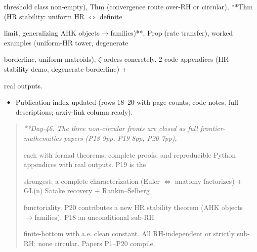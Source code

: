\documentclass[10pt]{article}
\begin{document}
  threshold class non-empty), Thm (convergence route over-RH or circular), **Thm (HR stability: uniform HR \ensuremath{\iff} definite\par
  limit, generalizing AHK objects\ensuremath{\to}families)**, Prop (rate transfer), worked examples (uniform-HR tower, degenerate\par
  borderline, uniform matroids), \ensuremath{\zeta}-orders concretely. 2 code appendices (HR stability demo, degenerate borderline) +\par
  real outputs.\par
\begin{itemize}
\item Publication index updated (rows 18--20 with page counts, code notes, full descriptions; arxiv-link column ready).
\end{itemize}

\begin{quote}\itshape
**Day-46. The three non-circular fronts are closed as full frontier-mathematics papers (P18 9pp, P19 8pp, P20 7pp),\par
each with formal theorems, complete proofs, and reproducible Python appendices with real outputs. P19 is the\par
strongest: a complete characterization (Euler \ensuremath{\iff} anatomy factorizes) + GL(n) Satake recovery + Rankin--Selberg\par
functoriality. P20 contributes a new HR stability theorem (AHK objects\ensuremath{\to}families). P18 an unconditional sub-RH\par
finite-bottom with a.e. clean constant. All RH-independent or strictly sub-RH; none circular. Papers P1--P20 compile.\par
\end{quote}
\end{document}
